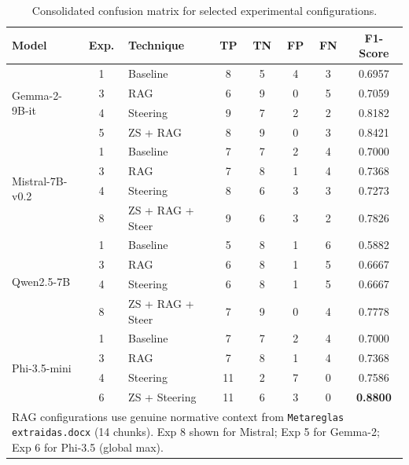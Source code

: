 \documentclass{ieeeaccess}
\begin{document}
\begin{table}[htbp]
\centering
\caption{Consolidated confusion matrix for selected experimental configurations.}
\label{tab:confusion_matrix}
\renewcommand{\arraystretch}{1.2}
\begin{tabular}{|l|c|l|c|c|c|c|c|}
\hline
\textbf{Model} & \textbf{Exp.} & \textbf{Technique} & \textbf{TP} & \textbf{TN} & \textbf{FP} & \textbf{FN} & \textbf{F1-Score} \\
\hline

\multirow{4}{*}{Gemma-2-9B-it}
& 1 & Baseline            & 8 & 5 & 4 & 3 & 0.6957 \\
& 3 & RAG                 & 6 & 9 & 0 & 5 & 0.7059 \\
& 4 & Steering            & 9 & 7 & 2 & 2 & 0.8182 \\
& 5 & ZS + RAG            & 8 & 9 & 0 & 3 & 0.8421 \\
\hline

\multirow{4}{*}{Mistral-7B-v0.2}
& 1 & Baseline            & 7 & 7 & 2 & 4 & 0.7000 \\
& 3 & RAG                 & 7 & 8 & 1 & 4 & 0.7368 \\
& 4 & Steering            & 8 & 6 & 3 & 3 & 0.7273 \\
& 8 & ZS + RAG + Steer    & 9 & 6 & 3 & 2 & 0.7826 \\
\hline

\multirow{4}{*}{Qwen2.5-7B}
& 1 & Baseline            & 5 & 8 & 1 & 6 & 0.5882 \\
& 3 & RAG                 & 6 & 8 & 1 & 5 & 0.6667 \\
& 4 & Steering            & 6 & 8 & 1 & 5 & 0.6667 \\
& 8 & ZS + RAG + Steer    & 7 & 9 & 0 & 4 & 0.7778 \\
\hline

\multirow{4}{*}{Phi-3.5-mini}
& 1 & Baseline            & 7 & 7 & 2 & 4 & 0.7000 \\
& 3 & RAG                 & 7 & 8 & 1 & 4 & 0.7368 \\
& 4 & Steering            & 11 & 2 & 7 & 0 & 0.7586 \\
& 6 & ZS + Steering       & 11 & 6 & 3 & 0 & \textbf{0.8800} \\
\hline
\multicolumn{8}{l}{\footnotesize RAG configurations use genuine normative context from \texttt{Metareglas extraidas.docx} (14 chunks). Exp 8 shown for Mistral; Exp 5 for Gemma-2; Exp 6 for Phi-3.5 (global max).} \\
\end{tabular}
\end{table}
\end{document}

